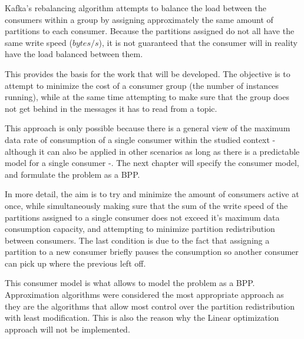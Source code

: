 Kafka's rebalancing algorithm attempts to balance the load between the consumers within a group by assigning approximately the same amount of partitions to each consumer. Because the partitions assigned do not all have the same write speed ($bytes/s$), it is not guaranteed that the consumer will in reality have the load balanced between them. 

This provides the basis for the work that will be developed. The objective is to attempt to minimize the cost of a consumer group (the number of instances running), while at the same time attempting to make sure that the group does not get behind in the messages it has to read from a topic. 

This approach is only possible because there is a general view of the maximum data rate of consumption of a single consumer within the studied context - although it can also be applied in other scenarios as long as there is a predictable model for a single consumer -. The next chapter will specify the consumer model, and formulate the problem as a BPP.

In more detail, the aim is to try and minimize the amount of consumers active at once, while simultaneously making sure that the sum of the write speed of the partitions assigned to a single consumer does not exceed it's maximum data consumption capacity, and attempting to minimize partition redistribution between consumers. The last condition is due to the fact that assigning a partition to a new consumer briefly pauses the consumption so another consumer can pick up where the previous left off. 

This consumer model is what allows to model the problem as a BPP. Approximation algorithms were considered the most appropriate approach as they are the algorithms that allow most control over the partition redistribution with least modification. This is also the reason why the Linear optimization approach will not be implemented. 



